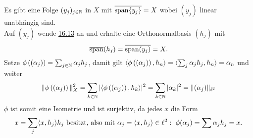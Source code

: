 \begin{beweis}
	Es gibt eine Folge $(y_{j})_{j \in \mathbb{N}}$ in $X$ mit $\overline{\operatorname{span}\{ y_{j} \}} = X$ wobei $(y_{j})$ linear unabhängig sind. \\
	Auf $(y_{j})$ wende \hyperref[satz:13.6-Orthogonalzerlegung]{16.13} an und erhalte eine Orthonormalbasis $(h_{j})$ mit 
		\[ \overline{\operatorname{span}}(h_{j}) = \overline{\operatorname{span}(y_{j})} = X. \]
	Setze $\phi \left( (\alpha_{j}) \right) = \sum_{j \in \mathbb{N}} \alpha_{j} h_{j}$, damit gilt $\langle \phi \left( (\alpha_{j}) \right) , h_{n} \rangle = \langle \sum_{j} \alpha_{j} h_{j}, h_{n} \rangle = \alpha_{n}$ und weiter
	 \[ \| \phi \left( (\alpha_{j}) \right)  \|^{2}_{X} = \sum_{k \in \mathbb{N}} | \langle \phi \left( (\alpha_{j}) \right), h_{k} \rangle |^{2} = \sum_{k \in \mathbb{N}} | \alpha_{k} |^{2} = \| (\alpha_{j}) \|_{\ell^{2}} \]
	$\phi$ ist somit eine Isometrie und ist surjektiv, da jedes $x$ die Form
	\[ x = \sum_{j} \langle x, h_{j} \rangle h_{j} \text{ besitzt, also mit }\alpha_{j} = \langle x, h_{j} \rangle \in \ell^{2}: \text{ } \phi(\alpha_{j} ) = \sum \alpha_{j} h_{j} = x. \]
\end{beweis}



\newpage